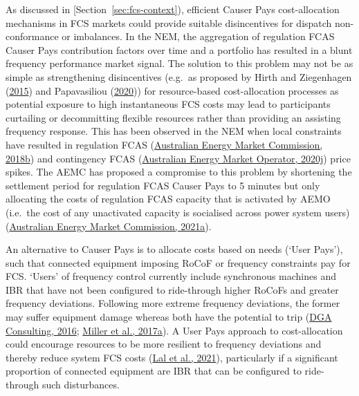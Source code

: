 \documentclass[12pt,a4paper,]{report}
\begin{document}
As discussed in {[}Section~\ref{sec:fcs-context}), efficient Causer Pays
cost-allocation mechanisms in FCS markets could provide suitable
disincentives for dispatch non-conformance or imbalances. In the NEM,
the aggregation of regulation FCAS Causer Pays contribution factors over
time and a portfolio has resulted in a blunt frequency performance
market signal. The solution to this problem may not be as simple as
strengthening disincentives (e.g.~as proposed by Hirth and Ziegenhagen
(\protect\hyperlink{ref-hirthBalancingPowerVariable2015}{2015}) and
Papavasiliou
(\protect\hyperlink{ref-papavasiliouScarcityPricingMissing2020}{2020}))
for resource-based cost-allocation processes as potential exposure to
high instantaneous FCS costs may lead to participants curtailing or
decommitting flexible resources rather than providing an assisting
frequency response. This has been observed in the NEM when local
constraints have resulted in regulation FCAS
(\protect\hyperlink{ref-australianenergymarketcommissionFrequencyControlFrameworks2018}{Australian
Energy Market Commission, 2018b}) and contingency FCAS
(\protect\hyperlink{ref-australianenergymarketoperatorQuarterlyEnergyDynamics2020}{Australian
Energy Market Operator, 2020j}) price spikes. The AEMC has proposed a
compromise to this problem by shortening the settlement period for
regulation FCAS Causer Pays to 5 minutes but only allocating the costs
of regulation FCAS capacity that is activated by AEMO (i.e.~the cost of
any unactivated capacity is socialised across power system users)
(\protect\hyperlink{ref-australianenergymarketcommissionPrimaryFrequencyResponse2021}{Australian
Energy Market Commission, 2021a}).

An alternative to Causer Pays is to allocate costs based on needs (`User
Pays'), such that connected equipment imposing RoCoF or frequency
constraints pay for FCS. `Users' of frequency control currently include
synchronous machines and IBR that have not been configured to
ride-through higher RoCoFs and greater frequency deviations. Following
more extreme frequency deviations, the former may suffer equipment
damage whereas both have the potential to trip
(\protect\hyperlink{ref-dgaconsultingInternationalReviewFrequency2016}{DGA
Consulting, 2016};
\protect\hyperlink{ref-millerAdvisoryEquipmentLimits2017}{Miller et al.,
2017a}). A User Pays approach to cost-allocation could encourage
resources to be more resilient to frequency deviations and thereby
reduce system FCS costs
(\protect\hyperlink{ref-lalEssentialSystemServices2021}{Lal et al.,
2021}), particularly if a significant proportion of connected equipment
are IBR that can be configured to ride-through such disturbances.
\end{document}
